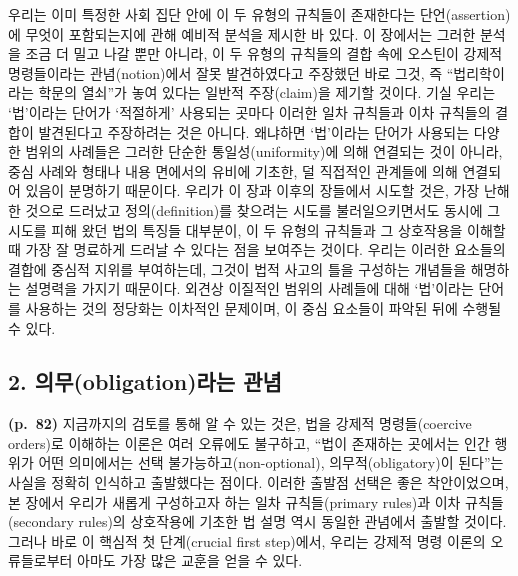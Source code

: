 우리는 이미 특정한 사회 집단 안에 이 두 유형의 규칙들이 존재한다는
단언(assertion)에 무엇이 포함되는지에 관해 예비적 분석을 제시한 바 있다.
이 장에서는 그러한 분석을 조금 더 밀고 나갈 뿐만 아니라, 이 두 유형의
규칙들의 결합 속에 오스틴이 강제적 명령들이라는 관념(notion)에서 잘못
발견하였다고 주장했던 바로 그것, 즉 “법리학이라는 학문의 열쇠”가 놓여
있다는 일반적 주장(claim)을 제기할 것이다. 기실 우리는 ‘법’이라는 단어가
‘적절하게’ 사용되는 곳마다 이러한 일차 규칙들과 이차 규칙들의 결합이
발견된다고 주장하려는 것은 아니다. 왜냐하면 ‘법’이라는 단어가 사용되는
다양한 범위의 사례들은 그러한 단순한 통일성(uniformity)에 의해 연결되는
것이 아니라, 중심 사례와 형태나 내용 면에서의 유비에 기초한, 덜 직접적인
관계들에 의해 연결되어 있음이 분명하기 때문이다. 우리가 이 장과 이후의
장들에서 시도할 것은, 가장 난해한 것으로 드러났고 정의(definition)를
찾으려는 시도를 불러일으키면서도 동시에 그 시도를 피해 왔던 법의 특징들
대부분이, 이 두 유형의 규칙들과 그 상호작용을 이해할 때 가장 잘 명료하게
드러날 수 있다는 점을 보여주는 것이다. 우리는 이러한 요소들의 결합에
중심적 지위를 부여하는데, 그것이 법적 사고의 틀을 구성하는 개념들을
해명하는 설명력을 가지기 때문이다. 외견상 이질적인 범위의 사례들에 대해
‘법’이라는 단어를 사용하는 것의 정당화는 이차적인 문제이며, 이 중심
요소들이 파악된 뒤에 수행될 수 있다.

\subsection{2. 의무(obligation)라는
관념}\label{uxc758uxbb34obligationuxb77cuxb294-uxad00uxb150}

\textbf{(p.~82)} 지금까지의 검토를 통해 알 수 있는 것은, 법을 강제적
명령들(coercive orders)로 이해하는 이론은 여러 오류에도 불구하고, “법이
존재하는 곳에서는 인간 행위가 어떤 의미에서는 선택
불가능하고(non-optional), 의무적(obligatory)이 된다”는 사실을 정확히
인식하고 출발했다는 점이다. 이러한 출발점 선택은 좋은 착안이었으며, 본
장에서 우리가 새롭게 구성하고자 하는 일차 규칙들(primary rules)과 이차
규칙들(secondary rules)의 상호작용에 기초한 법 설명 역시 동일한 관념에서
출발할 것이다. 그러나 바로 이 핵심적 첫 단계(crucial first step)에서,
우리는 강제적 명령 이론의 오류들로부터 아마도 가장 많은 교훈을 얻을 수
있다.


